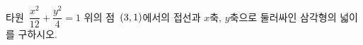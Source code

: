 타원~$\dfrac{x^2}{12}+\dfrac{y^2}{4}=1$ 위의 점~$(3{,}\mkern3mu\mathopen{}1)$에서의 접선과 $x$축, $y$축으로 둘러싸인 삼각형의 넓이를 구하시오.
